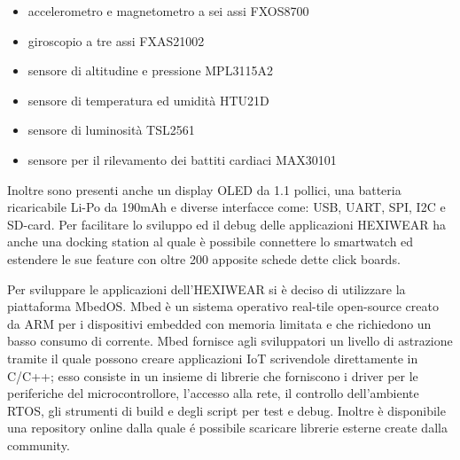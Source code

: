\begin{itemize}
    \item accelerometro e magnetometro a sei assi FXOS8700
    \item giroscopio a tre assi FXAS21002
    \item sensore di altitudine e pressione MPL3115A2
    \item sensore di temperatura ed umidità HTU21D
    \item sensore di luminosità TSL2561
    \item sensore per il rilevamento dei battiti cardiaci MAX30101
\end{itemize}

Inoltre sono presenti anche un display OLED da 1.1 pollici, una batteria ricaricabile Li-Po da 190mAh e diverse interfacce come: USB, UART, SPI, I2C e SD-card.
Per facilitare lo sviluppo ed il debug delle applicazioni HEXIWEAR ha anche una docking station al quale è possibile connettere lo smartwatch ed estendere le sue feature con oltre 200 apposite schede dette click boards.

Per sviluppare le applicazioni dell'HEXIWEAR si è deciso di utilizzare la piattaforma MbedOS. Mbed è un sistema operativo real-tile open-source creato da ARM per i dispositivi embedded con memoria limitata e che richiedono un basso consumo di corrente. 
Mbed fornisce agli sviluppatori un livello di astrazione tramite il quale possono creare applicazioni IoT scrivendole direttamente in C/C++; esso consiste in un insieme di librerie che forniscono i driver per le periferiche del microcontrollore, l'accesso alla rete, il controllo dell'ambiente RTOS, gli strumenti di build e degli script per test e debug. 
Inoltre è disponibile una repository online dalla quale é possibile scaricare librerie esterne create dalla community.
